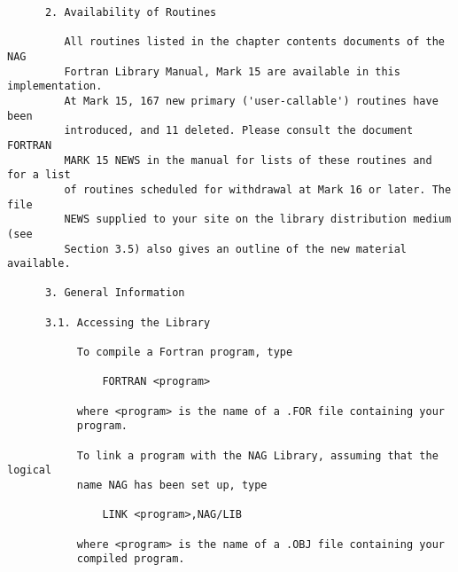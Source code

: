 \begin{small}
\begin{verbatim}
      2. Availability of Routines                                               
                                                                                
         All routines listed in the chapter contents documents of the NAG       
         Fortran Library Manual, Mark 15 are available in this implementation.  
         At Mark 15, 167 new primary ('user-callable') routines have been       
         introduced, and 11 deleted. Please consult the document FORTRAN        
         MARK 15 NEWS in the manual for lists of these routines and for a list  
         of routines scheduled for withdrawal at Mark 16 or later. The file     
         NEWS supplied to your site on the library distribution medium (see     
         Section 3.5) also gives an outline of the new material available.      
                                                                                
      3. General Information                                                    
                                                                                
      3.1. Accessing the Library                                                
                                                                                
           To compile a Fortran program, type                                   
                                                                                
               FORTRAN <program>                                                
                                                                                
           where <program> is the name of a .FOR file containing your           
           program.                                                             
                                                                                
           To link a program with the NAG Library, assuming that the logical    
           name NAG has been set up, type                                       
                                                                                
               LINK <program>,NAG/LIB                                           
                                                                                
           where <program> is the name of a .OBJ file containing your           
           compiled program.                                                    
                                                                                

\end{verbatim}
\end{small}
